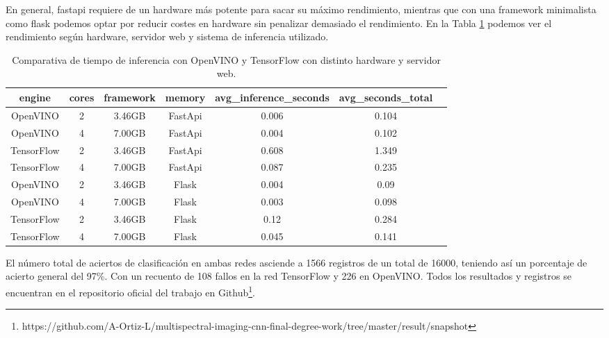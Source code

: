 En general, fastapi requiere de un hardware más potente para sacar su máximo rendimiento, mientras que con una framework minimalista como flask podemos optar por reducir costes en hardware sin penalizar demasiado el rendimiento.
En la Tabla \ref{tab:Comparativa de tiempo de inferencia con OpenVINO y TensorFlow con distinto hardware y servidor web} podemos ver el rendimiento según hardware, servidor web y sistema de inferencia utilizado.

\begin{table}[ht]
    \begin{center}
        \small
        \begin{tabular}{ | c | c | c | c| c | c | c |}
            \hline
            engine & cores & framework & memory & avg\_inference\_seconds & avg\_seconds\_total \\ \hline
            OpenVINO & 2 & 3.46GB & FastApi & 0.006 & 0.104 \\
            OpenVINO & 4 & 7.00GB & FastApi & 0.004 & 0.102 \\
            TensorFlow & 2 & 3.46GB & FastApi & 0.608 & 1.349 \\
            TensorFlow & 4 & 7.00GB & FastApi & 0.087 & 0.235 \\
            OpenVINO & 2 & 3.46GB & Flask & 0.004 & 0.09 \\
            OpenVINO & 4 & 7.00GB & Flask & 0.003 & 0.098 \\
            TensorFlow & 2 & 3.46GB & Flask & 0.12 & 0.284 \\
            TensorFlow & 4 & 7.00GB & Flask & 0.045 & 0.141 \\ \hline
        \end{tabular}
    \end{center}
    \caption{Comparativa de tiempo de inferencia con OpenVINO y TensorFlow con distinto hardware y servidor web.}
    \label{tab:Comparativa de tiempo de inferencia con OpenVINO y TensorFlow con distinto hardware y servidor web}
\end{table}


El número total de aciertos de clasificación en ambas redes asciende a 1566 registros de un total de 16000, teniendo así un porcentaje de acierto general
del 97\%. Con un recuento de 108 fallos en la red TensorFlow y 226 en OpenVINO.
Todos los resultados y registros se encuentran en el repositorio oficial del trabajo en Github\footnote{https://github.com/A-Ortiz-L/multispectral-imaging-cnn-final-degree-work/tree/master/result/snapshot}.


